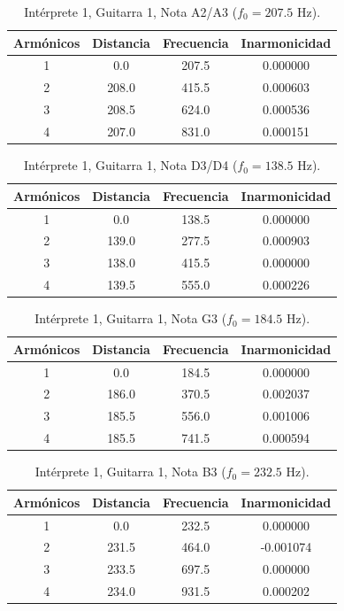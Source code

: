 \begin{table}[htbp]
  \centering
 \small
  \caption{Intérprete 1, Guitarra 1, Nota A2/A3 ($f_0 = 207.5$ Hz).}
  \label{tab:interprete1_g1_a2_a3}
  \begin{tabular}{cccc}
  \toprule
  Armónicos & Distancia & Frecuencia & Inarmonicidad \\
  \midrule
  1 & 0.0 & 207.5 & 0.000000 \\
  2 & 208.0 & 415.5 & 0.000603 \\
  3 & 208.5 & 624.0 & 0.000536 \\
  4 & 207.0 & 831.0 & 0.000151 \\
  \bottomrule
  \end{tabular}
\end{table}

\begin{table}[htbp]
  \centering
 \small
  \caption{Intérprete 1, Guitarra 1, Nota D3/D4 ($f_0 = 138.5$ Hz).}
  \label{tab:interprete1_g1_d3_d4}
  \begin{tabular}{cccc}
  \toprule
  Armónicos & Distancia & Frecuencia & Inarmonicidad \\
  \midrule
  1 & 0.0 & 138.5 & 0.000000 \\
  2 & 139.0 & 277.5 & 0.000903 \\
  3 & 138.0 & 415.5 & 0.000000 \\
  4 & 139.5 & 555.0 & 0.000226 \\
  \bottomrule
  \end{tabular}
\end{table}

\begin{table}[htbp]
  \centering
 \small
  \caption{Intérprete 1, Guitarra 1, Nota G3 ($f_0 = 184.5$ Hz).}
  \label{tab:interprete1_g1_g3}
  \begin{tabular}{cccc}
  \toprule
  Armónicos & Distancia & Frecuencia & Inarmonicidad \\
  \midrule
  1 & 0.0 & 184.5 & 0.000000 \\
  2 & 186.0 & 370.5 & 0.002037 \\
  3 & 185.5 & 556.0 & 0.001006 \\
  4 & 185.5 & 741.5 & 0.000594 \\
  \bottomrule
  \end{tabular}
\end{table}

\begin{table}[htbp]
  \centering
 \small
  \caption{Intérprete 1, Guitarra 1, Nota B3 ($f_0 = 232.5$ Hz).}
  \label{tab:interprete1_g1_b3}
  \begin{tabular}{cccc}
  \toprule
  Armónicos & Distancia & Frecuencia & Inarmonicidad \\
  \midrule
  1 & 0.0 & 232.5 & 0.000000 \\
  2 & 231.5 & 464.0 & -0.001074 \\
  3 & 233.5 & 697.5 & 0.000000 \\
  4 & 234.0 & 931.5 & 0.000202 \\
  \bottomrule
  \end{tabular}
\end{table}

